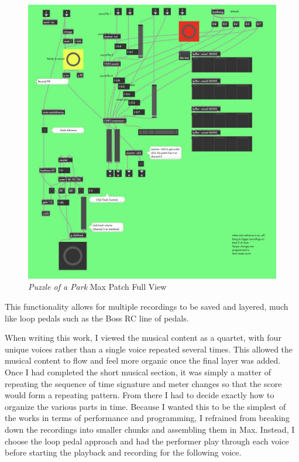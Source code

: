 \begin{figure}
    \centering
    \includegraphics[scale=0.25]{diagrams/maxPatches/puzzleRaw.jpg}
    \caption{\textit{Puzzle of a Park} Max Patch Full View}
    \label{fig:puzzlePatchRaw}
\end{figure}

This functionality allows for multiple recordings to be saved and layered, much like loop pedals such as the Boss RC line of pedals.

When writing this work, I viewed the musical content as a quartet, with four unique voices rather than a single voice repeated several times. This allowed the musical content to flow and feel more organic once the final layer was added. Once I had completed the short musical section, it was simply a matter of repeating the sequence of time signature and meter changes so that the score would form a repeating pattern. From there I had to decide exactly how to organize the various parts in time. Because I wanted this to be the simplest of the works in terms of performance and programming, I refrained from breaking down the recordings into smaller chunks and assembling them in Max. Instead, I choose the loop pedal approach and had the performer play through each voice before starting the playback and recording for the following voice. 

